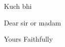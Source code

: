 \documentclass{letter}
\begin{document}
\begin{letter}{Kuch bhi }
\opening{Dear sir or madam}
\lipsum
\closing{Yours Faithfully}
\end{letter}
\end{document}
